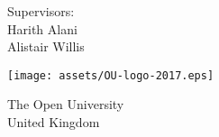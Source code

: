 \begin{titlepage}
    \begin{center}
        \vspace*{1cm}
            
        \Huge
        \textbf{\thetitle}
            
        \vspace{1cm}
        \LARGE
        \makeatletter \@subtitle \makeatother %
            
        \vspace{1.5cm}
            
        \textbf{\theauthor}
            
        \vfill
            
        Supervisors:\\
        Harith Alani\\
        Alistair Willis
            
        \vspace{0.8cm}
            
        \texttt{[image: assets/OU-logo-2017.eps]}
        \vspace{1.6cm}
        
        \centering
        \usebox{\largestimage}
        \hfill
        
        \vspace{0.8cm}
            
        \Large
        The Open University\\
        United Kingdom\\
        \thedate
            
    \end{center}
\end{titlepage}